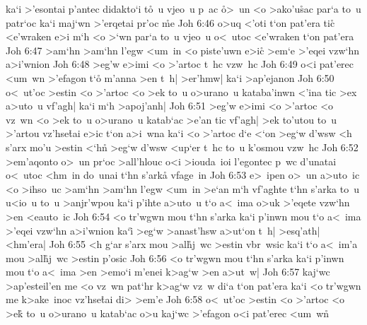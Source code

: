 ka`i
>'esontai
p'antec
didakto`i
t\r{o}~u
vjeo~u
p~ac
\r{o}>~un
<o
>ako'u\r{s}ac
par`a
to~u
patr`oc
ka`i
maj`wn
>'erqetai
pr'oc
\r{m}e\bibvsend
{}
\vs Joh 6:46
o>uq
<'oti
t`on
pat'era
tic\r{}
<e'wraken
e>i
m`h
<o
>`wn
par`a
to~u
vjeo~u
o<~utoc
<e'wraken
t`on
pat'era\bibvsend
\vs Joh 6:47
>am`hn
>am`hn
l'egw
<um~in
<o
piste'uwn
e>ic\r{}
>em`e
>'eqei
vzw`hn
a>i'wnion\bibvsend
\vs Joh 6:48
>eg'w
e>imi
<o
>'artoc
t~hc
vzw~hc\bibvsend
\vs Joh 6:49
o<i
pat'erec
<um~wn
>'efagon
t`o\r{}
m'anna
>en
t~h|
>er'hmw|
ka`i
>ap'ejanon\bibvsend
\vs Joh 6:50
o<~ut'oc
>estin
<o
>'artoc
<o
>ek
to~u
o>urano~u
kataba'inwn
<'ina
tic
>ex
a>uto~u
vf'agh|
ka`i
m`h
>apoj'anh|\bibvsend
\vs Joh 6:51
>eg'w
e>imi
<o
>'artoc
<o
vz~wn
<o
>ek
to~u
o>urano~u
katab`ac
>e'an
tic
vf'agh|
>ek
to'utou
to~u
>'artou
vz'hse\r{t}ai
e>ic
t`on
a>i~wna
ka`i
<o
>'artoc
d`e
<`on
>eg`w
d'wsw
<h
s'arx
mo'u
>estin
<`hn\r{}
>eg`w
d'wsw
<up`er
t~hc
to~u
k'osmou
vzw~hc\bibvsend
\vs Joh 6:52
>em'aqonto
o>~un
pr`oc
>all'hlouc
o<i
>iouda~ioi
l'egontec
p~wc
d'unatai
o<~utoc
<hm~in
do~unai
t`hn
s'ark\r{a}
vfage~in\bibvsend
\vs Joh 6:53
e>~ipen
o>~un
a>uto~ic
<o
>ihso~uc
>am`hn
>am`hn
l'egw
<um~in
>e`an
m`h
vf'aghte
t`hn
s'arka
to~u
u<io~u
to~u
>anjr'wpou
ka`i
p'ihte
a>uto~u
t`o
a<~ima
o>uk
>'eqete
vzw`hn
>en
<eauto~ic\bibvsend
\vs Joh 6:54
<o
tr'wgwn
mou
t`hn
s'arka
ka`i
p'inwn
mou
t`o
a<~ima
>'eqei
vzw`hn
a>i'wnion
ka`i\r{}
>eg`w
>anast'hsw
a>ut`on
t~h|
>esq'ath|
<hm'era|\bibvsend
\vs Joh 6:55
<h
g`ar
s'arx
mou
>al\r{h}j~wc
>estin
vbr~wsic
ka`i
t`o
a<~im'a
mou
>al\r{h}j~wc
>estin
p'osic\bibvsend
\vs Joh 6:56
<o
tr'wgwn
mou
t`hn
s'arka
ka`i
p'inwn
mou
t`o
a<~ima
>en
>emo`i
m'enei
k>ag`w
>en
a>ut~w|\bibvsend
\vs Joh 6:57
kaj`wc
>ap'esteil'en
me
<o
vz~wn
pat`hr
k>ag`w
vz~w
di`a
t`on
pat'era
ka`i
<o
tr'wgwn
me
k>ake~inoc
vz'hse\r{t}ai
di>
>em'e\bibvsend
\vs Joh 6:58
o<~ut'oc
>estin
<o
>'artoc
<o
>ek\r{}
to~u
o>urano~u
katab`ac
o>u
kaj`wc
>'efagon
o<i
pat'erec
<um~wn\r{}
